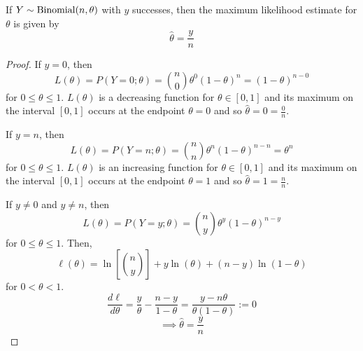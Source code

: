 \begin{thmbox}
    \begin{prop}
        If $ Y \sim \operatorname{Binomial}(n,\theta) $ with $ y $ successes, then the
        maximum likelihood estimate for $ \theta $ is given by
        \[ \hat{\theta}=\frac{y}{n} \]
    \end{prop}
\end{thmbox}
\begin{proof}
    If $ y=0 $, then
    \[ L(\theta)=P(Y=0;\theta)=\binom{n}{0}\theta^0(1-\theta)^n=(1-\theta)^{n-0} \]
    for $ 0\leqslant \theta \leqslant 1 $. $ L(\theta) $ is a decreasing function
    for $ \theta\in[0,1] $ and its maximum on the interval $ [0,1] $
    occurs at the endpoint $ \theta=0 $ and so $ \hat{\theta}=0=\frac{0}{n} $.

    If $ y=n $, then
    \[ L(\theta)=P(Y=n;\theta)=\binom{n}{n}\theta^n(1-\theta)^{n-n}=\theta^n \]
    for $ 0\leqslant \theta \leqslant 1 $. $ L(\theta) $ is an increasing function
    for $ \theta\in[0,1] $ and its maximum on the interval $ [0,1] $
    occurs at the endpoint $ \theta=1 $ and so $ \hat{\theta}=1=\frac{n}{n} $.

    If $ y\neq 0 $ and $ y\neq n $, then
    \[ L(\theta)=P(Y=y;\theta)=\binom{n}{y}\theta^y(1-\theta)^{n-y} \]
    for $ 0\leqslant \theta\leqslant 1 $. Then,
    \[ \ell(\theta)=\ln\left[ \binom{n}{y} \right]+y\ln(\theta)+(n-y)\ln(1-\theta) \]
    for $ 0<\theta<1 $.
    \[ \frac{d\ell}{d\theta}=\frac{y}{\theta}-\frac{n-y}{1-\theta}=\frac{y-n\theta}{\theta(1-\theta)}:=0  \]
    \[ \implies \hat{\theta}=\frac{y}{n} \]
\end{proof}

